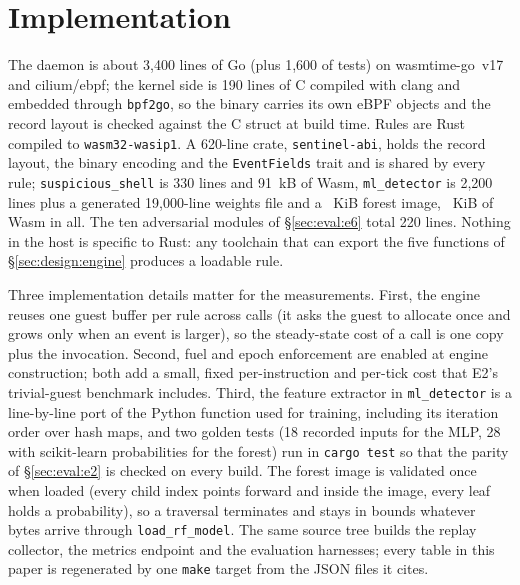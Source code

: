 \section{Implementation}
\label{sec:impl}

The daemon is about 3,400 lines of Go (plus 1,600 of tests) on
wasmtime-go~v17~\cite{wasmtime} and cilium/ebpf; the kernel side is 190
lines of C compiled with clang and embedded through \texttt{bpf2go}, so the
binary carries its own eBPF objects and the record layout is checked
against the C struct at build time. Rules are Rust compiled to
\texttt{wasm32-wasip1}. A 620-line crate, \texttt{sentinel-abi}, holds the
record layout, the binary encoding and the \texttt{EventFields} trait and is
shared by every rule; \texttt{suspicious\_shell} is 330 lines and
\SI{91}{kB} of Wasm, \texttt{ml\_detector} is 2,200 lines plus a generated
19,000-line weights file and a \rfKiB{}~KiB forest image, \mlModuleKiB{}~KiB
of Wasm in all. The ten adversarial modules of \S\ref{sec:eval:e6} total 220
lines. Nothing in the host is specific to Rust: any toolchain that can export
the five functions of \S\ref{sec:design:engine} produces a loadable rule.

Three implementation details matter for the measurements. First, the
engine reuses one guest buffer per rule across calls (it asks the guest to
allocate once and grows only when an event is larger), so the steady-state
cost of a call is one copy plus the invocation. Second, fuel and epoch
enforcement are enabled at engine construction; both add a small, fixed
per-instruction and per-tick cost that E2's trivial-guest benchmark
includes. Third, the feature extractor in \texttt{ml\_detector} is a
line-by-line port of the Python function used for training, including its
iteration order over hash maps, and two golden tests (18 recorded inputs
for the MLP, 28 with scikit-learn probabilities for the forest) run in
\texttt{cargo test} so that the parity of \S\ref{sec:eval:e2} is checked on
every build. The forest image is validated once when loaded (every child
index points forward and inside the image, every leaf holds a probability),
so a traversal terminates and stays in bounds whatever bytes arrive through
\texttt{load\_rf\_model}. The same source tree builds the replay collector,
the metrics endpoint and the evaluation harnesses; every table in this
paper is regenerated by one \texttt{make} target from the JSON files it
cites.
